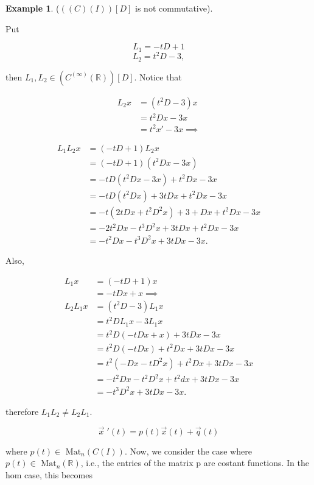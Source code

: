 \documentclass[12pt,a4paper]{article}
\theoremstyle{definition}
\newtheorem*{example}{Example}
\begin{document}
\begin{example}
(\( ((C)(I))[D] \) is not commutative). 

Put

\[ L_1 = -tD+1 \]
\[ L_2 = t^2D - 3, \]

then \( L_1, L_2 \in ( C^{(\infty)}( \mathbb{R}) ) [D] \). Notice that 

\begin{align*}
  L_2x &= (t^2D-3)x \\
  &= t^2Dx-3x \\
  &= t^2x' -3x \implies
\end{align*}

\begin{align*}
  L_1L_2x &= (-tD + 1)L_2x \\
  &= (-tD + 1)(t^2Dx-3x) \\
  &= -tD(t^2Dx-3x) + t^2Dx-3x \\
  &= -tD(t^2Dx) + 3tDx + t^2Dx-3x \\
  &= -t(2tDx + t^2D^2x) + 3+ Dx + t^2Dx-3x \\
  &= -2t^2Dx - t^3D^2x + 3tDx + t^2Dx - 3x \\
  &= -t^2Dx - t^3D^2x + 3tDx - 3x. 
\end{align*}

Also, 

\begin{align*}
  L_1x &= (-tD+1)x \\
  &= -tDx + x \implies \\
  L_2L_1x &= (t^2D-3)L_1x \\
  &= t^2DL_1x - 3L_1x \\
  &= t^2D(-tDx+x) + 3tDx - 3x \\
  &= t^2D(-tDx) + t^2Dx + 3tDx-3x \\
  &= t^2( -Dx- tD^2x) + t^2Dx+3tDx - 3x \\
  &= -t^2Dx - t^2D^2x + t^2dx + 3tDx - 3x \\
  &= -t^3D^2x+ 3tDx-3x. 
\end{align*}

therefore \( L_1L_2 \neq L_2L_1. \)

\end{example}


\[   \vec{x} \;'(t) = p(t) \vec{x}(t) + \vec{q}(t) \]

where \( p(t) \in \text{ Mat}_n (C(I)) \). Now, we consider the case
where \(  p(t) \in \text{ Mat}_n ( \mathbb{R})  \), i.e., the entries of
the matrix p are costant functions. In the hom case, this becomes 
\end{document}
